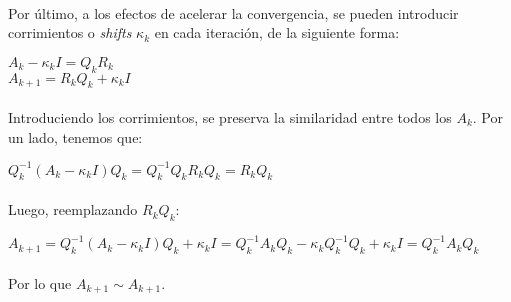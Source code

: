 \documentclass[12pt, twocolumn]{article}
\begin{document}
	\paragraph{} Por último, a los efectos de acelerar la convergencia, se pueden introducir corrimientos o \textit{shifts} $\kappa_{k}$ en cada iteración, de la siguiente forma:
	
	\begin{center}
		$A_{k} - \kappa_{k}I = Q_{k}R_{k}$ \\
		$A_{k+1} = R_{k}Q_{k} + \kappa_{k}I$ 
	\end{center}
	
	\paragraph{} Introduciendo los corrimientos, se preserva la similaridad entre todos los $A_{k}$. Por un lado, tenemos que:
	
	\begin{center}
		$Q_{k}^{-1}(A_{k} - \kappa_{k}I)Q_{k} = Q_{k}^{-1}Q_{k}R_{k}Q_{k} = R_{k}Q_{k}$
	\end{center}
	
	\paragraph{} Luego, reemplazando $R_{k}Q_{k}$:
	
	\begin{center}
		$A_{k+1} = Q_{k}^{-1}(A_{k} - \kappa_{k}I)Q_{k} + \kappa_{k}I = Q_{k}^{-1}A_{k}Q_{k} - \kappa_{k}Q_{k}^{-1}Q_{k} + \kappa_{k}I = Q_{k}^{-1}A_{k}Q_{k} $ 
	\end{center}
	
	\paragraph{} Por lo que $A_{k+1} \sim A_{k+1}$. 
	
	
	
\end{document}
